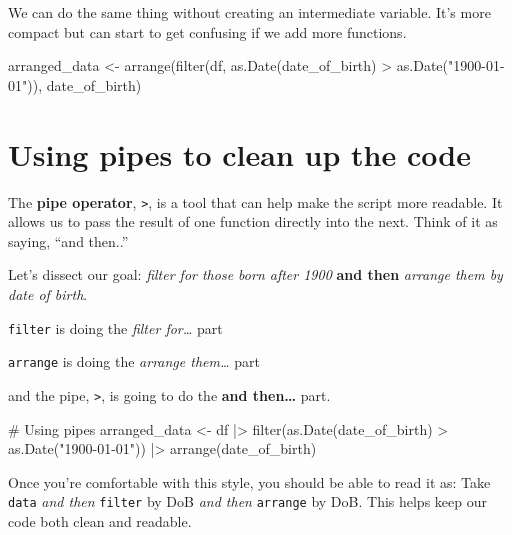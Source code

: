 \documentclass[
  letterpaper,
  DIV=11,
  numbers=noendperiod]{scrreprt}
\newenvironment{Shaded}{\begin{snugshade}}{\end{snugshade}}
\newcommand{\CommentTok}[1]{\textcolor[rgb]{0.37,0.37,0.37}{#1}}
\newcommand{\FunctionTok}[1]{\textcolor[rgb]{0.28,0.35,0.67}{#1}}
\newcommand{\NormalTok}[1]{\textcolor[rgb]{0.00,0.23,0.31}{#1}}
\newcommand{\OtherTok}[1]{\textcolor[rgb]{0.00,0.23,0.31}{#1}}
\newcommand{\SpecialCharTok}[1]{\textcolor[rgb]{0.37,0.37,0.37}{#1}}
\newcommand{\StringTok}[1]{\textcolor[rgb]{0.13,0.47,0.30}{#1}}
\begin{document}
We can do the same thing without creating an intermediate variable. It's
more compact but can start to get confusing if we add more functions.

\begin{Shaded}
\begin{Highlighting}[]
\NormalTok{arranged\_data }\OtherTok{\textless{}{-}} \FunctionTok{arrange}\NormalTok{(}\FunctionTok{filter}\NormalTok{(df, }\FunctionTok{as.Date}\NormalTok{(date\_of\_birth) }\SpecialCharTok{\textgreater{}} \FunctionTok{as.Date}\NormalTok{(}\StringTok{"1900{-}01{-}01"}\NormalTok{)), date\_of\_birth)}
\end{Highlighting}
\end{Shaded}

\section{Using pipes to clean up the code}

The \textbf{pipe operator}, \texttt{\textbar{}\textgreater{}}, is a tool
that can help make the script more readable. It allows us to pass the
result of one function directly into the next. Think of it as saying,
``and then..''

Let's dissect our goal: \emph{filter for those born after 1900}
\textbf{and then} \emph{arrange them by date of birth}.

\texttt{filter} is doing the \emph{filter for\ldots{}} part

\texttt{arrange} is doing the \emph{arrange them\ldots{}} part

and the pipe, \texttt{\textbar{}\textgreater{}}, is going to do the
\textbf{and then\ldots{}} part.

\begin{Shaded}
\begin{Highlighting}[]
\CommentTok{\# Using pipes}
\NormalTok{arranged\_data }\OtherTok{\textless{}{-}}\NormalTok{ df }\SpecialCharTok{|\textgreater{}}
  \FunctionTok{filter}\NormalTok{(}\FunctionTok{as.Date}\NormalTok{(date\_of\_birth) }\SpecialCharTok{\textgreater{}} \FunctionTok{as.Date}\NormalTok{(}\StringTok{"1900{-}01{-}01"}\NormalTok{)) }\SpecialCharTok{|\textgreater{}}
  \FunctionTok{arrange}\NormalTok{(date\_of\_birth)}
\end{Highlighting}
\end{Shaded}

Once you're comfortable with this style, you should be able to read it
as: Take \texttt{data} \emph{and then} \texttt{filter} by DoB \emph{and
then} \texttt{arrange} by DoB. This helps keep our code both clean and
readable.
\end{document}
